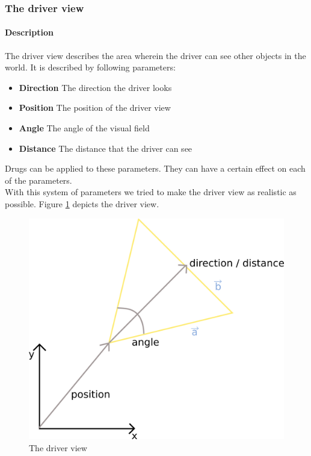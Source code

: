 \subsubsection{The driver view}
\label{sec:driverView}

\paragraph{Description}

The driver view describes the area wherein the driver can see other objects in
the world. It is described by following parameters:

\begin{itemize}
\item \textbf{Direction} The direction the driver looks
\item \textbf{Position} The position of the driver view 
\item \textbf{Angle} The angle of the visual field
\item \textbf{Distance} The distance that the driver can see
\end{itemize}

\noindent Drugs can be applied to these parameters. They can have a certain effect
on each of the parameters. \\

\noindent With this system of parameters we tried to make the driver view as realistic
as possible. Figure \ref{fig:driverView} depicts the driver view.

\begin{figure}[H]
\begin{center}
\includegraphics[scale=0.4]{images/driverview.png}
\end{center}
\caption{The driver view}
\label{fig:driverView}
\end{figure}

